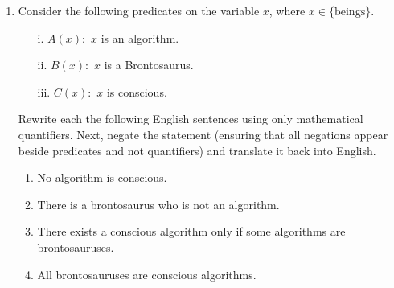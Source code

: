 \begin{enumerate}

















    
    \item Consider the following predicates on the variable $x$, where $x \in \{\text{beings}\}.$
    \begin{enumerate}
        \item[i.] $A(x):$ $x$ is an algorithm.
        \item[ii.] $B(x):$ $x$ is a Brontosaurus.
        \item[iii.] $C(x):$ $x$ is conscious.
    \end{enumerate}
    Rewrite each the following English sentences using only mathematical quantifiers. Next, negate the statement (ensuring that all negations appear beside predicates and not quantifiers) and translate it back into English. 
    
    \begin{enumerate}
        \item No algorithm is conscious.
        
        \item There is a brontosaurus who is not an algorithm.
        
        \item There exists a conscious algorithm only if some algorithms are brontosauruses.
        
        \item All brontosauruses are conscious algorithms.
    \end{enumerate}
    

\end{enumerate}
